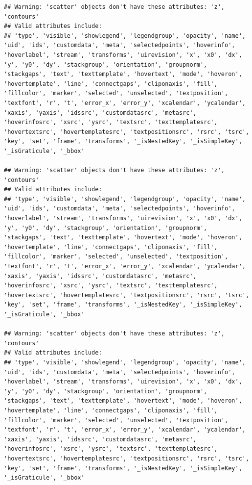 \documentclass[
]{article}
\begin{document}
\begin{verbatim}
## Warning: 'scatter' objects don't have these attributes: 'z', 'contours'
## Valid attributes include:
## 'type', 'visible', 'showlegend', 'legendgroup', 'opacity', 'name', 'uid', 'ids', 'customdata', 'meta', 'selectedpoints', 'hoverinfo', 'hoverlabel', 'stream', 'transforms', 'uirevision', 'x', 'x0', 'dx', 'y', 'y0', 'dy', 'stackgroup', 'orientation', 'groupnorm', 'stackgaps', 'text', 'texttemplate', 'hovertext', 'mode', 'hoveron', 'hovertemplate', 'line', 'connectgaps', 'cliponaxis', 'fill', 'fillcolor', 'marker', 'selected', 'unselected', 'textposition', 'textfont', 'r', 't', 'error_x', 'error_y', 'xcalendar', 'ycalendar', 'xaxis', 'yaxis', 'idssrc', 'customdatasrc', 'metasrc', 'hoverinfosrc', 'xsrc', 'ysrc', 'textsrc', 'texttemplatesrc', 'hovertextsrc', 'hovertemplatesrc', 'textpositionsrc', 'rsrc', 'tsrc', 'key', 'set', 'frame', 'transforms', '_isNestedKey', '_isSimpleKey', '_isGraticule', '_bbox'

## Warning: 'scatter' objects don't have these attributes: 'z', 'contours'
## Valid attributes include:
## 'type', 'visible', 'showlegend', 'legendgroup', 'opacity', 'name', 'uid', 'ids', 'customdata', 'meta', 'selectedpoints', 'hoverinfo', 'hoverlabel', 'stream', 'transforms', 'uirevision', 'x', 'x0', 'dx', 'y', 'y0', 'dy', 'stackgroup', 'orientation', 'groupnorm', 'stackgaps', 'text', 'texttemplate', 'hovertext', 'mode', 'hoveron', 'hovertemplate', 'line', 'connectgaps', 'cliponaxis', 'fill', 'fillcolor', 'marker', 'selected', 'unselected', 'textposition', 'textfont', 'r', 't', 'error_x', 'error_y', 'xcalendar', 'ycalendar', 'xaxis', 'yaxis', 'idssrc', 'customdatasrc', 'metasrc', 'hoverinfosrc', 'xsrc', 'ysrc', 'textsrc', 'texttemplatesrc', 'hovertextsrc', 'hovertemplatesrc', 'textpositionsrc', 'rsrc', 'tsrc', 'key', 'set', 'frame', 'transforms', '_isNestedKey', '_isSimpleKey', '_isGraticule', '_bbox'

## Warning: 'scatter' objects don't have these attributes: 'z', 'contours'
## Valid attributes include:
## 'type', 'visible', 'showlegend', 'legendgroup', 'opacity', 'name', 'uid', 'ids', 'customdata', 'meta', 'selectedpoints', 'hoverinfo', 'hoverlabel', 'stream', 'transforms', 'uirevision', 'x', 'x0', 'dx', 'y', 'y0', 'dy', 'stackgroup', 'orientation', 'groupnorm', 'stackgaps', 'text', 'texttemplate', 'hovertext', 'mode', 'hoveron', 'hovertemplate', 'line', 'connectgaps', 'cliponaxis', 'fill', 'fillcolor', 'marker', 'selected', 'unselected', 'textposition', 'textfont', 'r', 't', 'error_x', 'error_y', 'xcalendar', 'ycalendar', 'xaxis', 'yaxis', 'idssrc', 'customdatasrc', 'metasrc', 'hoverinfosrc', 'xsrc', 'ysrc', 'textsrc', 'texttemplatesrc', 'hovertextsrc', 'hovertemplatesrc', 'textpositionsrc', 'rsrc', 'tsrc', 'key', 'set', 'frame', 'transforms', '_isNestedKey', '_isSimpleKey', '_isGraticule', '_bbox'


\end{verbatim}
\end{document}
